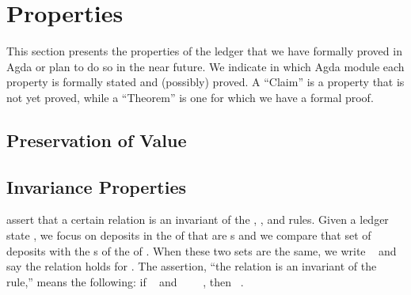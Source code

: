 \documentclass[11pt,a4paper,dvipsnames]{article}
\begin{document}
\tableofcontents



\section{Properties}
This section presents the properties of the ledger that we have formally proved in
Agda or plan to do so in the near future.  We indicate in which Agda module each
property is formally stated and (possibly) proved. A ``Claim'' is a property that is
not yet proved, while a ``Theorem'' is one for which we have a formal proof.

\subsection{Preservation of Value}

\subsection{Invariance Properties}
 assert that
a certain relation is an invariant of the \LEDGER{}, \EPOCH{}, and \CHAIN{} rules.
Given a ledger state , we focus on deposits in the
\UTxOState{} of  that are \GovActionDeposit{}s and we compare that set of
deposits with the \GovActionDeposit{}s of the \GovState{} of .
When these two sets are the same, we write ~ and say
the  relation holds for .
The assertion, ``the  relation is an invariant of the
\LEDGER{} rule,'' means the following:  if \govDepsMatch{}~ and
~~~~, then
\govDepsMatch{}~.

\end{document}

